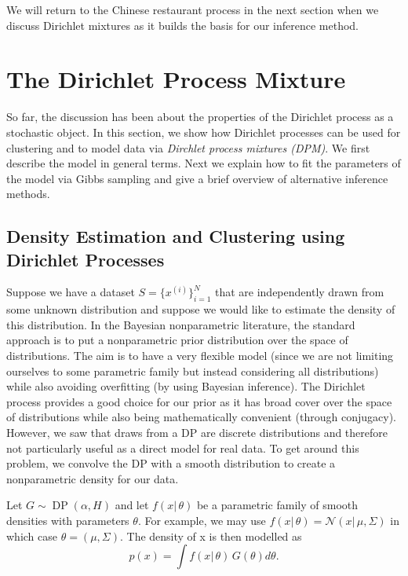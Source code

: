 \documentclass[final,3p,times,twocolumn]{elsarticle}
\DeclareMathOperator*{\DP}{DP}
\begin{document}
We will return to the Chinese restaurant process in the next section when we discuss Dirichlet mixtures as it builds the basis for our inference method.

\section{The Dirichlet Process Mixture}
\label{sect:DPM}
So far, the discussion has been about the properties of the Dirichlet process as a stochastic object.
In this section, we show how Dirichlet processes can be used for clustering and to model data via \emph{Dirchlet process mixtures (DPM)}.
We first describe the model in general terms.
Next we explain how to fit the parameters of the model via Gibbs sampling and give a brief overview of alternative inference methods.

\subsection{Density Estimation and Clustering using Dirichlet Processes}
Suppose we have a dataset $S = \{x^{(i)}\}_{i=1}^N$ that are independently drawn from some unknown distribution and suppose we would like to estimate the density of this distribution.
In the Bayesian nonparametric literature, the standard approach is to put a nonparametric prior distribution over the space of distributions.
The aim is to have a very flexible model (since we are not limiting ourselves to some parametric family but instead considering all distributions) while also avoiding overfitting (by using Bayesian inference).
The Dirichlet process provides a good choice for our prior as it has broad cover over the space of distributions while also being mathematically convenient (through conjugacy).
However, we saw that draws from a DP are discrete distributions and therefore not particularly useful as a direct model for real data.
To get around this problem, we convolve the DP with a smooth distribution to create a nonparametric density for our data.

Let $G \sim \DP(\alpha,H)$ and let $f(x|\,\theta)$ be a parametric family of smooth densities with parameters $\theta$. 
For example, we may use $f(x|\,\theta) = \mathcal{N}(x|\,\mu,\Sigma)$ in which case $\theta = (\mu,\Sigma)$.
The density of x is then modelled as 
\begin{equation}
p(x) = \int f(x|\,\theta)\, G(\theta)d\theta.
\end{equation}
\end{document}
